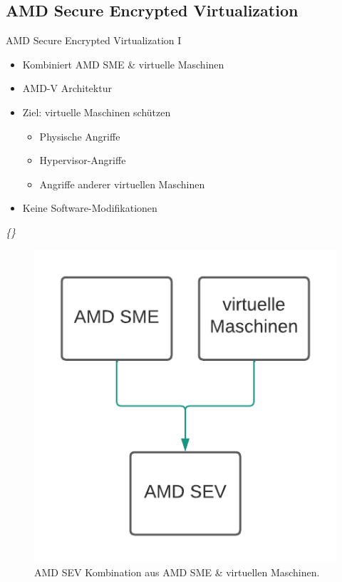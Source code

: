 \documentclass{sdqbeamer}
\begin{document}
\subsection{AMD Secure Encrypted Virtualization}
\begin{frame}{AMD Secure Encrypted Virtualization I}
	\begin{minipage}{0.6\linewidth}
		\begin{itemize}
			\item Kombiniert AMD SME \& virtuelle Maschinen
			\item AMD-V Architektur
			\item Ziel: virtuelle Maschinen schützen
			\begin{itemize}
				\item Physische Angriffe
				\item Hypervisor-Angriffe
				\item Angriffe anderer virtuellen Maschinen
			\end{itemize}
			\item Keine Software-Modifikationen
		\end{itemize}
		\vspace{3ex}
		\vfill
		\small\textit{\{\cite{kaplan, buhren}\}}
	\end{minipage}
	\begin{minipage}{0.39\linewidth}
		\begin{figure}[!h]
			\centering
			\includegraphics[width=0.7\linewidth]{Bilder/sme_vm_sev.png}
			\caption{AMD SEV Kombination aus AMD SME \& virtuellen Maschinen.}
		\end{figure}
	\end{minipage}
\end{frame}
\end{document}
